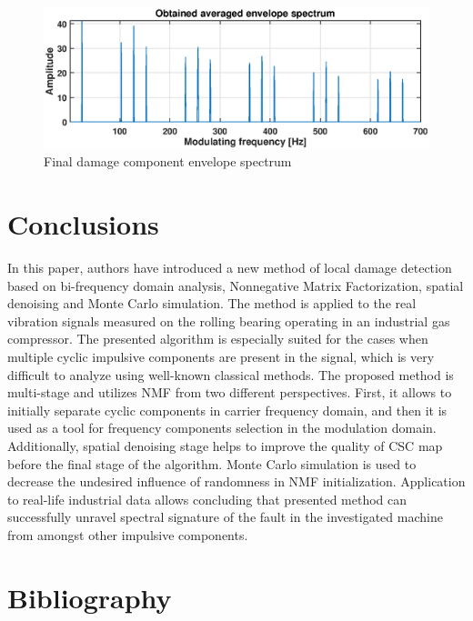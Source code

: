 \documentclass[3p, 12pt]{elsarticle} %
\begin{document}
\begin{figure}[ht!]
\centering
\includegraphics[width=.7\textwidth]{wykresy/out2}
\caption{Final damage component envelope spectrum}
\label{fig:out2}
\end{figure}

\section{Conclusions}

In this paper, authors have introduced a new method of local damage detection based on bi-frequency domain analysis, Nonnegative Matrix Factorization, spatial denoising and Monte Carlo simulation. The method is applied to the real vibration signals measured on the rolling bearing operating in an industrial gas compressor. The presented algorithm is especially suited for the cases when multiple cyclic impulsive components are present in the signal, which is very difficult to analyze using well-known classical methods. The proposed method is multi-stage and utilizes NMF from two different perspectives. First, it allows to initially separate cyclic components in carrier frequency domain, and then it is used as a tool for frequency components selection in the modulation domain. Additionally, spatial denoising stage helps to improve the quality of CSC map before the final stage of the algorithm. Monte Carlo simulation is used to decrease the undesired influence of randomness in NMF initialization. Application to real-life industrial data allows concluding that presented method can successfully unravel spectral signature of the fault in the investigated machine from amongst other impulsive components.

\section*{Bibliography}

% 

\end{document}
